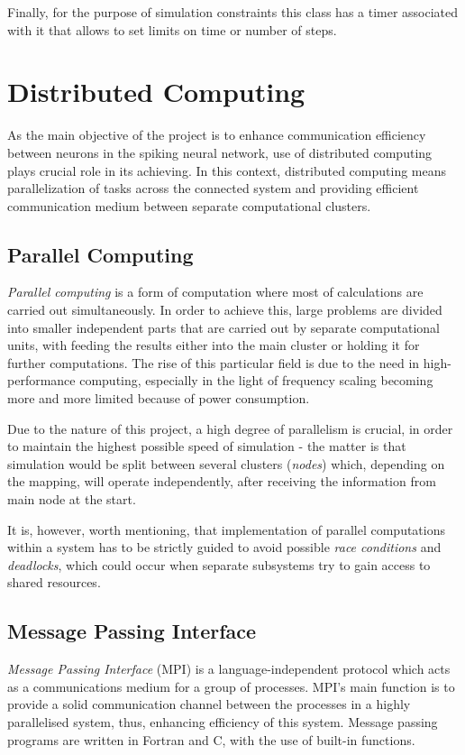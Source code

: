 Finally, for the purpose of simulation constraints this class has a timer associated with it that allows to set limits on time or number of steps.
\section{Distributed Computing}

As the main objective of the project is to enhance communication efficiency between neurons in the spiking neural network, use of distributed computing plays crucial
role in its achieving. In this context, distributed computing means parallelization of tasks across the connected system and providing efficient communication medium
between separate computational clusters.

\subsection{Parallel Computing}

\emph{Parallel computing} is a form of computation where most of calculations are carried out simultaneously.\cite{G.S.Almasi1989} In order to achieve this, large problems
are divided into smaller independent parts that are carried out by separate computational units, with feeding the results either into the main cluster or holding it for further
computations. The rise of this particular field is due to the need in high-performance computing, especially in the light of frequency scaling becoming more and more
limited because of power consumption.\cite{Kumar2002}

Due to the nature of this project, a high degree of parallelism is crucial, in order to maintain the highest possible speed of simulation - the matter is that simulation would
be split between several clusters (\emph{nodes}) which, depending on the mapping, will operate independently, after receiving the information from main node at the start.

It is, however, worth mentioning, that implementation of parallel computations within a system has to be strictly guided to avoid possible \emph{race conditions} and \emph{deadlocks}, which
could occur when separate subsystems try to gain access to shared resources.

\subsection{Message Passing Interface}

\emph{Message Passing Interface} (MPI) is a language-independent protocol which acts as a communications medium for a group of processes.\cite{mpi} MPI's main function is to provide
a solid communication channel between the processes in a highly parallelised system, thus, enhancing efficiency of this system. Message passing programs are written in Fortran and 
C, with the use of built-in functions.

